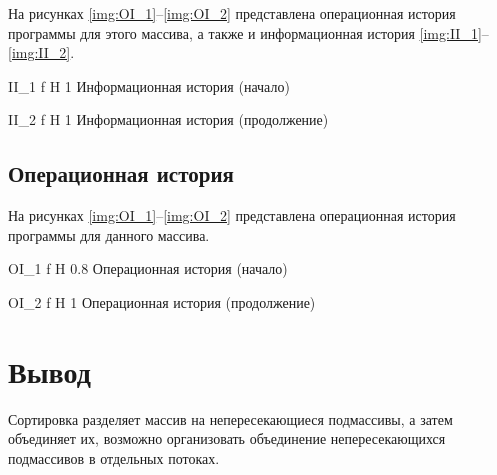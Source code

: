 На рисунках \ref{img:OI_1}--\ref{img:OI_2} представлена операционная история программы для этого массива, а также и информационная история \ref{img:II_1}--\ref{img:II_2}.

{II_1} %
{f} %
{H} %
{1\textwidth} %
{Информационная история (начало)} %

{II_2} %
{f} %
{H} %
{1\textwidth} %
{Информационная история (продолжение)} %


\subsection{Операционная история}
На рисунках \ref{img:OI_1}--\ref{img:OI_2} представлена операционная история программы для данного массива.

{OI_1} %
{f} %
{H} %
{0.8\textwidth} %
{Операционная  история (начало)} %

{OI_2} %
{f} %
{H} %
{1\textwidth} %
{Операционная  история (продолжение)} %


\section*{Вывод}
Сортировка разделяет массив на непересекающиеся подмассивы, а затем
объединяет их, возможно организовать объединение непересекающихся подмассивов  в отдельных потоках.

